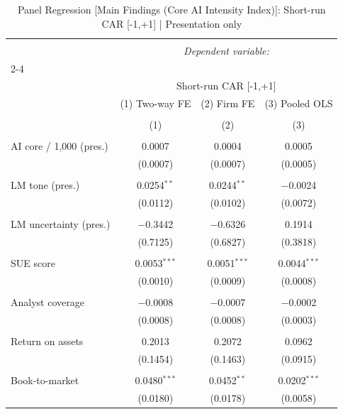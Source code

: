 
\begin{table}[!htbp] \centering 
  \caption{Panel Regression [Main Findings (Core AI Intensity Index)]: Short-run CAR [-1,+1]  |  Presentation only} 
  \label{} 
\begin{tabular}{@{\extracolsep{5pt}}lccc} 
\\[-1.8ex]\hline 
\hline \\[-1.8ex] 
 & \multicolumn{3}{c}{\textit{Dependent variable:}} \\ 
\cline{2-4} 
\\[-1.8ex] & \multicolumn{3}{c}{Short-run CAR [-1,+1]} \\ 
 & (1) Two-way FE & (2) Firm FE & (3) Pooled OLS \\ 
\\[-1.8ex] & (1) & (2) & (3)\\ 
\hline \\[-1.8ex] 
 AI core / 1,000 (pres.) & 0.0007 & 0.0004 & 0.0005 \\ 
  & (0.0007) & (0.0007) & (0.0005) \\ 
  & & & \\ 
 LM tone (pres.) & 0.0254$^{**}$ & 0.0244$^{**}$ & $-$0.0024 \\ 
  & (0.0112) & (0.0102) & (0.0072) \\ 
  & & & \\ 
 LM uncertainty (pres.) & $-$0.3442 & $-$0.6326 & 0.1914 \\ 
  & (0.7125) & (0.6827) & (0.3818) \\ 
  & & & \\ 
 SUE score & 0.0053$^{***}$ & 0.0051$^{***}$ & 0.0044$^{***}$ \\ 
  & (0.0010) & (0.0009) & (0.0008) \\ 
  & & & \\ 
 Analyst coverage & $-$0.0008 & $-$0.0007 & $-$0.0002 \\ 
  & (0.0008) & (0.0008) & (0.0003) \\ 
  & & & \\ 
 Return on assets & 0.2013 & 0.2072 & 0.0962 \\ 
  & (0.1454) & (0.1463) & (0.0915) \\ 
  & & & \\ 
 Book-to-market & 0.0480$^{***}$ & 0.0452$^{**}$ & 0.0202$^{***}$ \\ 
  & (0.0180) & (0.0178) & (0.0058) \\ 

\end{tabular}
\end{table}
